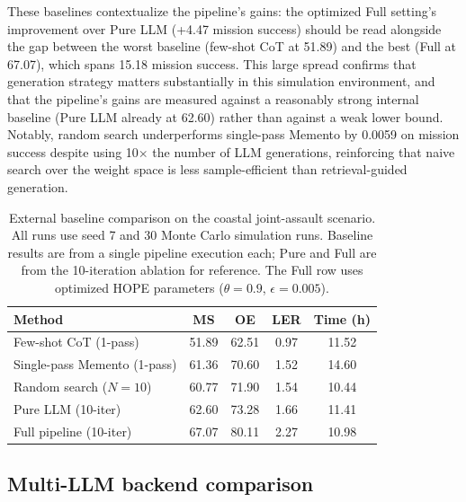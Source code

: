 These baselines contextualize the pipeline's gains: the optimized Full setting's improvement over Pure LLM (+4.47 mission success) should be read alongside the gap between the worst baseline (few-shot CoT at 51.89) and the best (Full at 67.07), which spans 15.18 mission success. This large spread confirms that generation strategy matters substantially in this simulation environment, and that the pipeline's gains are measured against a reasonably strong internal baseline (Pure LLM already at 62.60) rather than against a weak lower bound. Notably, random search underperforms single-pass Memento by 0.0059 on mission success despite using 10$\times$ the number of LLM generations, reinforcing that naive search over the weight space is less sample-efficient than retrieval-guided generation.

\begin{table}[ht]
\centering
\caption{External baseline comparison on the coastal joint-assault scenario. All runs use seed 7 and 30 Monte Carlo simulation runs. Baseline results are from a single pipeline execution each; Pure and Full are from the 10-iteration ablation for reference. The Full row uses optimized HOPE parameters ($\theta=0.9$, $\epsilon=0.005$).}
\label{tab:baseline-comparison}
\footnotesize
\setlength{\tabcolsep}{4.5pt}
\begin{tabular}{lcccc}
\toprule
Method & MS & OE & LER & Time (h) \\
\midrule
Few-shot CoT (1-pass) & 51.89 & 62.51 & 0.97 & 11.52 \\
Single-pass Memento (1-pass) & 61.36 & 70.60 & 1.52 & 14.60 \\
Random search ($N{=}10$) & 60.77 & 71.90 & 1.54 & 10.44 \\
Pure LLM (10-iter) & 62.60 & 73.28 & 1.66 & 11.41 \\
Full pipeline (10-iter) & 67.07 & 80.11 & 2.27 & 10.98 \\
\bottomrule
\end{tabular}
\end{table}

\subsection{Multi-LLM backend comparison}

